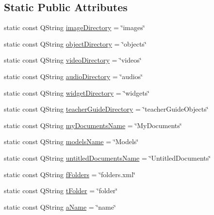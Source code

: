 \subsection*{Static Public Attributes}
\begin{DoxyCompactItemize}
\item 
static const Q\-String \hyperlink{class_u_b_persistence_manager_afc92c7516c08081b8443076d1554e471}{image\-Directory} = \char`\"{}images\char`\"{}
\item 
static const Q\-String \hyperlink{class_u_b_persistence_manager_a12dbae5a490687164448695c8e278f35}{object\-Directory} = \char`\"{}objects\char`\"{}
\item 
static const Q\-String \hyperlink{class_u_b_persistence_manager_a6d2a1dff335f20f14fba15798c778aa7}{video\-Directory} = \char`\"{}videos\char`\"{}
\item 
static const Q\-String \hyperlink{class_u_b_persistence_manager_ad68b2f4bbd480f2119432f4b6f4b20d3}{audio\-Directory} = \char`\"{}audios\char`\"{}
\item 
static const Q\-String \hyperlink{class_u_b_persistence_manager_a7c481362bd285b72aa501b9a6f70b314}{widget\-Directory} = \char`\"{}widgets\char`\"{}
\item 
static const Q\-String \hyperlink{class_u_b_persistence_manager_a7cf10cf338fb0268d89d4b916043da40}{teacher\-Guide\-Directory} = \char`\"{}teacher\-Guide\-Objects\char`\"{}
\item 
static const Q\-String \hyperlink{class_u_b_persistence_manager_a2e74c9a3298e87f0aca9e9e087ef5dcc}{my\-Documents\-Name} = \char`\"{}My\-Documents\char`\"{}
\item 
static const Q\-String \hyperlink{class_u_b_persistence_manager_a7eaef6e12db76b89277eca477511204e}{models\-Name} = \char`\"{}Models\char`\"{}
\item 
static const Q\-String \hyperlink{class_u_b_persistence_manager_a785a394deaab51518902d5afbfcc694b}{untitled\-Documents\-Name} = \char`\"{}Untitled\-Documents\char`\"{}
\item 
static const Q\-String \hyperlink{class_u_b_persistence_manager_ade8494f17a2732ac48f67f9a64b477c0}{f\-Folders} = \char`\"{}folders.\-xml\char`\"{}
\item 
static const Q\-String \hyperlink{class_u_b_persistence_manager_a904c350945d0fd7cf109e939822d5fe3}{t\-Folder} = \char`\"{}folder\char`\"{}
\item 
static const Q\-String \hyperlink{class_u_b_persistence_manager_acec3642d6307c311babc692556ce946e}{a\-Name} = \char`\"{}name\char`\"{}
\end{DoxyCompactItemize}


